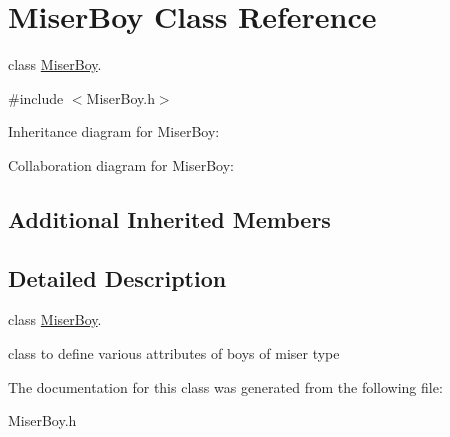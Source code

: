 \hypertarget{classMiserBoy}{}\section{Miser\+Boy Class Reference}
\label{classMiserBoy}


class \hyperlink{classMiserBoy}{Miser\+Boy}.  




{\ttfamily \#include $<$Miser\+Boy.\+h$>$}



Inheritance diagram for Miser\+Boy\+:


Collaboration diagram for Miser\+Boy\+:
\subsection*{Additional Inherited Members}


\subsection{Detailed Description}
class \hyperlink{classMiserBoy}{Miser\+Boy}. 

class to define various attributes of boys of miser type 

The documentation for this class was generated from the following file\+:\begin{DoxyCompactItemize}
\item 
Miser\+Boy.\+h\end{DoxyCompactItemize}
